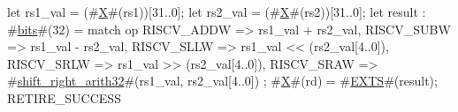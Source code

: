 let rs1_val = (#\hyperref[sailRISCVzX]{X}#(rs1))[31..0];
let rs2_val = (#\hyperref[sailRISCVzX]{X}#(rs2))[31..0];
let result : #\hyperref[sailRISCVzbits]{bits}#(32) = match op {
  RISCV_ADDW => rs1_val + rs2_val,
  RISCV_SUBW => rs1_val - rs2_val,
  RISCV_SLLW => rs1_val << (rs2_val[4..0]),
  RISCV_SRLW => rs1_val >> (rs2_val[4..0]),
  RISCV_SRAW => #\hyperref[sailRISCVzshiftzyrightzyarith32]{shift\_right\_arith32}#(rs1_val, rs2_val[4..0])
};
#\hyperref[sailRISCVzX]{X}#(rd) = #\hyperref[sailRISCVzEXTS]{EXTS}#(result);
RETIRE_SUCCESS
